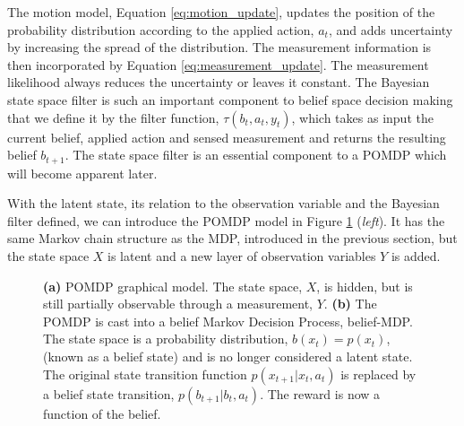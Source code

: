 The motion model, Equation \ref{eq:motion_update}, updates the position of the probability distribution according to 
the applied action, $a_t$, and adds uncertainty by increasing the spread of the distribution. The measurement information is 
then incorporated by Equation \ref{eq:measurement_update}. The measurement likelihood always reduces the uncertainty 
or leaves it constant. The Bayesian state space filter is such an important 
component to belief space decision making that we define it by the filter function, $\tau(b_t,a_t,y_t)$, which 
takes as input the current belief, applied action and sensed measurement and returns the resulting belief $b_{t+1}$.
The state space filter is an essential component to a POMDP which will become apparent later.

With the latent state, its relation to the observation variable and the Bayesian filter defined, we can introduce the POMDP model
in Figure \ref{fig:pomdp} (\textit{left}). It has the same Markov chain structure as the MDP, introduced in the previous section, but the state space $X$ is latent and 
a new layer of observation variables $Y$ is added. 

\begin{figure}
 \centering
  \centering
  \caption{\textbf{(a)} POMDP graphical model. The state space, $X$, is hidden, but is still partially observable through a 
  measurement, $Y$. \textbf{(b)} The POMDP is cast into a belief Markov Decision Process, belief-MDP. The state space is 
  a probability distribution, $b(x_t) = p(x_t)$, (known as a belief state) and is no longer considered a latent state. The original state 
  transition function $p(x_{t+1}|x_t,a_t)$ is replaced by a belief state transition, $p(b_{t+1}|b_t,a_t)$. The reward 
  is now a function of the belief.}
  \label{fig:pomdp}
\end{figure}


